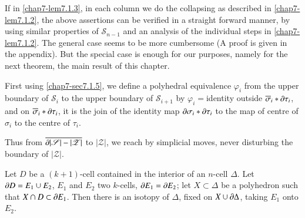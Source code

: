If in \ref{chap7-lem7.1.3}, in each column we do the collapsing as described in \ref{chap7-lem7.1.2}, the above assertions can be verified in a straight forward manner, by using similar properties of $\mathscr{S}_{n-1}$ and an analysis of the individual steps in \ref{chap7-lem7.1.2}. The general case seems to be more cumbersome (A proof is given in the appendix). But the special case is enough for our purposes, namely for the next theorem, the main result of this chapter.

First using \ref{chap7-sec7.1.5}, we define a polyhedral equivalence $\varphi_{i}$ from the upper boundary of $\mathscr{S}_{i}$ to the upper boundary of $\mathscr{S}_{i+1}$ by $\varphi_{i}=$\pageoriginale identity outside $\overline{\sigma}_{i}\ast \partial \tau_{i}$, and on $\overline{\sigma}_{i}\ast\partial \tau_{i}$, it is the join of the identity map $\partial \sigma_{i}\ast\partial \tau_{i}$ to the map of centre of $\sigma_{i}$ to the centre of $\tau_{i}$.

Thus from $\overline{\partial|\mathscr{S}|-|\mathscr{Z}|}$ to $|\mathscr{Z}|$, we reach by simplicial moves, never disturbing the boundary of $|\mathscr{Z}|$.

\setcounter{proposition}{5}
\begin{theorem}\label{chap7-thm7.1.6}
Let $D$ be a $(k+1)$-cell contained in the interior of an $n$-cell $\Delta$. Let $\partial D=E_{1}\cup E_{2}$, $E_{1}$ and $E_{2}$ two $k$-cells, $\partial E_{1}=\partial E_{2}$; let $X\subset \Delta$ be a polyhedron such that $X\cap D\subset \partial E_{1}$. Then there is an isotopy of $\Delta$, fixed on $X\cup \partial \Delta$, taking $E_{1}$ onto $E_{2}$.
\end{theorem}

\medskip

